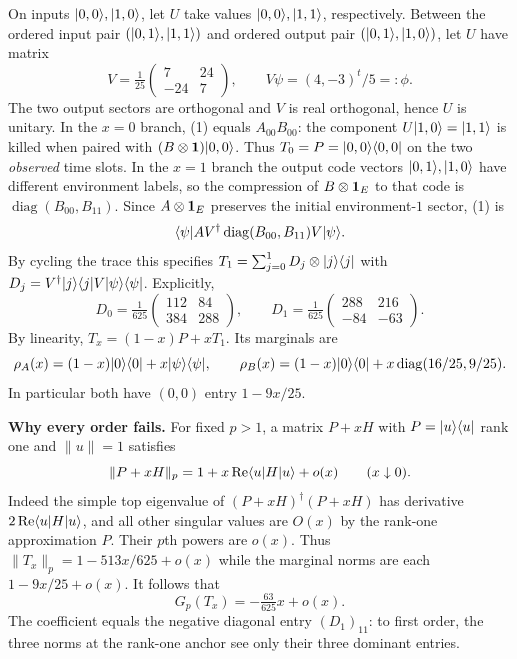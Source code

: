 \documentclass[11pt]{article}
\begin{document}
On inputs $|0,0\rangle,|1,0\rangle$, let $U$ take values $|0,0\rangle,|1,1\rangle$, respectively. Between the ordered input pair $(|0,1\rangle,|1,1\rangle)$ and ordered output pair $(|0,1\rangle,|1,0\rangle)$, let $U$ have matrix
\[
 V=\tfrac1{25}\begin{pmatrix}7&24\\-24&7\end{pmatrix},\qquad V\psi=(4,-3)^t/5=:\phi .
\]
The two output sectors are orthogonal and $V$ is real orthogonal, hence $U$ is unitary. In the $x=0$ branch, (1) equals $A_{00}B_{00}$: the component $U|1,0\rangle=|1,1\rangle$ is killed when paired with $(B\otimes\mathbf1)|0,0\rangle$. Thus $T_0=P=|0,0\rangle\langle 0,0|$ on the two \emph{observed} time slots.
\newpage
In the $x=1$ branch the output code vectors $|0,1\rangle,|1,0\rangle$ have different environment labels, so the compression of $B\otimes\mathbf1_E$ to that code is $\operatorname{diag}(B_{00},B_{11})$. Since $A\otimes\mathbf1_E$ preserves the initial environment-$1$ sector, (1) is
\[
 \langle \psi| A V^\dagger \operatorname{diag}(B_{00},B_{11})V|\psi\rangle .
\]
By cycling the trace this specifies
$T_1=\sum_{j=0}^1 D_j\otimes|j\rangle\langle j|$ with
$D_j=V^\dagger|j\rangle\langle j| V|\psi\rangle\langle \psi|$. Explicitly,
\[
 D_0=\tfrac1{625}\begin{pmatrix}112&84\\384&288\end{pmatrix},
 \qquad D_1=\tfrac1{625}\begin{pmatrix}288&216\\-84&-63\end{pmatrix}.
\]
By linearity, $T_x=(1-x)P+xT_1$. Its marginals are
\[
 \rho_A(x)=(1-x)|0\rangle\langle 0|+x|\psi\rangle\langle \psi|,\qquad
 \rho_B(x)=(1-x)|0\rangle\langle 0|+x\operatorname{diag}(16/25,9/25).
\]
In particular both have $(0,0)$ entry $1-9x/25$.

\textbf{Why every order fails.} For fixed $p>1$, a matrix $P+xH$ with $P=|u\rangle\langle u|$ rank one and $\|u\|=1$ satisfies
\[
 \|P+xH\|_p=1+x\operatorname{Re}\langle u|H|u\rangle+o(x)\qquad(x\downarrow0).
\]
Indeed the simple top eigenvalue of $(P+xH)^\dagger(P+xH)$ has derivative $2\operatorname{Re}\langle u|H|u\rangle$, and all other singular values are $O(x)$ by the rank-one approximation $P$. Their $p$th powers are $o(x)$. Thus $\|T_x\|_p=1-513x/625+o(x)$ while the marginal norms are each $1-9x/25+o(x)$. It follows that
\[
 G_p(T_x)=-\tfrac{63}{625}x+o(x).
\]
The coefficient equals the negative diagonal entry $(D_1)_{11}$: to first order, the three norms at the rank-one anchor see only their three dominant entries.
\end{document}
